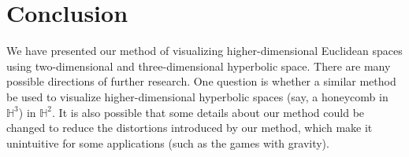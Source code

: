\documentclass{article}
\begin{document}
\section{Conclusion}

We have presented our method of visualizing higher-dimensional Euclidean spaces using two-dimensional and three-dimensional
hyperbolic space. There are many possible directions of further research. One question is whether a similar method be used to visualize
higher-dimensional hyperbolic spaces (say, a honeycomb in $\mathbb{H}^3$) in $\mathbb{H}^2$. It is also possible that some details about
our method could be changed to reduce the distortions introduced by our method, which make it unintuitive for some applications (such as the games with gravity).




\end{document}
